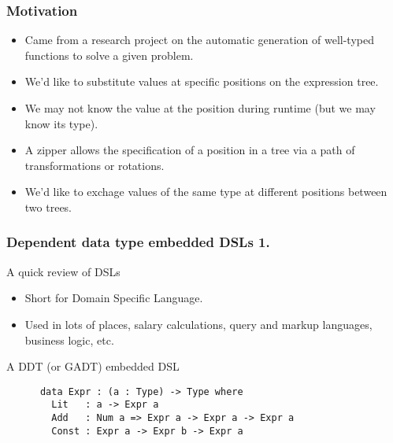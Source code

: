 \documentclass{beamer}
\begin{document}
\begin{frame}[fragile]
  \frametitle{Motivation}
  \begin{itemize}
    \item Came from a research project on the automatic generation of 
      well-typed functions to solve a given problem.
    \item We'd like to substitute values at specific positions on
      the expression tree.
    \item We may not know the value at the position during runtime
      (but we may know its type).
    \item A zipper allows the specification of a position in a tree
      via a path of transformations or rotations.
    \item We'd like to exchage values of the same type at different
      positions between two trees.
  \end{itemize}
\end{frame}

\begin{frame}[fragile]
  \frametitle{Dependent data type embedded DSLs 1.}
  \begin{block}{A quick review of DSLs}
    \begin{itemize}
      \item Short for Domain Specific Language.
      \item Used in lots of places, salary calculations, query and
        markup languages, business logic, etc.
    \end{itemize}
  \end{block}
  \begin{block}{A DDT (or GADT) embedded DSL}
    \begin{verbatim}
      data Expr : (a : Type) -> Type where
        Lit   : a -> Expr a
        Add   : Num a => Expr a -> Expr a -> Expr a
        Const : Expr a -> Expr b -> Expr a
    \end{verbatim}
  \end{block}
\end{frame}
\end{document}
